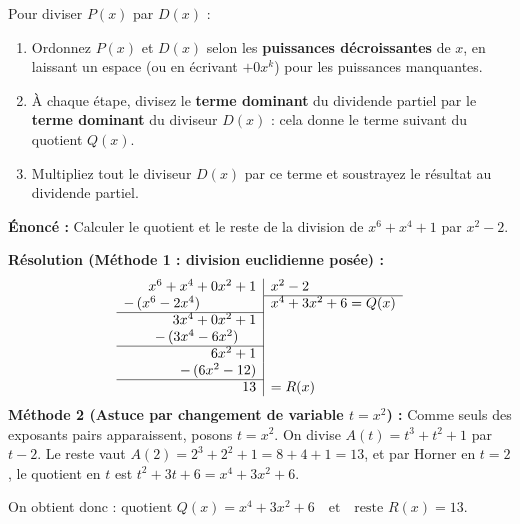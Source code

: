Pour diviser $P(x)$ par $D(x)$ :
\begin{enumerate}
    \item Ordonnez $P(x)$ et $D(x)$ selon les \textbf{puissances décroissantes} de $x$, en laissant un espace (ou en écrivant $+0x^k$) pour les puissances manquantes.
    \item À chaque étape, divisez le \textbf{terme dominant} du dividende partiel par le \textbf{terme dominant} du diviseur $D(x)$ : cela donne le terme suivant du quotient $Q(x)$.
    \item Multipliez tout le diviseur $D(x)$ par ce terme et soustrayez le résultat au dividende partiel.
\end{enumerate}

\begin{exemple}
\textbf{Énoncé :} Calculer le quotient et le reste de la division de $x^6 + x^4 + 1$ par $x^2 - 2$.

\textbf{Résolution (Méthode 1 : division euclidienne posée) :}
\[
\begin{array}{r|l}
    x^6 + x^4 + 0x^2 + 1 & x^2 - 2 \\
    \cline{2-2}
    -\,(x^6 - 2x^4) \phantom{+ 0x^2 + 1} & x^4 + 3x^2 + 6 = Q(x) \\
    \cline{1-1}
    3x^4 + 0x^2 + 1 & \\
    -\,(3x^4 - 6x^2) \phantom{+ 1} & \\
    \cline{1-1}
    6x^2 + 1 & \\
    -\,(6x^2 - 12) & \\
    \cline{1-1}
    13 & = R(x)
\end{array}
\]
\textbf{Méthode 2 (Astuce par changement de variable $t = x^2$) :} Comme seuls des exposants pairs apparaissent, posons $t = x^2$. On divise $A(t) = t^3 + t^2 + 1$ par $t - 2$. Le reste vaut $A(2) = 2^3 + 2^2 + 1 = 8 + 4 + 1 = 13$, et par Horner en $t=2$, le quotient en $t$ est $t^2 + 3t + 6 = x^4 + 3x^2 + 6$.

On obtient donc : $\boxed{\text{quotient } Q(x) = x^4 + 3x^2 + 6 \quad \text{et} \quad \text{reste } R(x) = 13}$.
\end{exemple}


